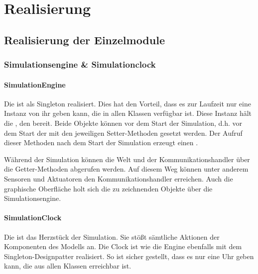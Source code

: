 \chapter{Realisierung}\label{chapter:realization}
%
\section{Realisierung der Einzelmodule}

\subsection{Simulationsengine \& Simulationclock}\label{subsec:real_engine}
\subsubsection{SimulationEngine}
Die  ist als Singleton realisiert. Dies hat den Vorteil, dass es zur Laufzeit nur eine Instanz von ihr geben kann, die in allen Klassen verfügbar ist. Diese Instanz hält die , den  bereit. Beide Objekte können vor dem Start der Simulation, d.h. vor dem Start der  mit den jeweiligen Setter-Methoden gesetzt werden. Der Aufruf dieser Methoden nach dem Start der Simulation erzeugt einen .

Während der Simulation können die Welt und der Kommunikationshandler über die Getter-Methoden abgerufen werden. Auf diesem Weg können unter anderem Sensoren und Aktuatoren den Kommunikationshandler erreichen. Auch die graphische Oberfläche holt sich die zu zeichnenden Objekte über die Simulationsengine.

\subsubsection{SimulationClock}
Die  ist das Herzstück der Simulation. Sie stößt sämtliche Aktionen der Komponenten des Modells an. Die Clock ist wie die Engine ebenfalls mit dem Singleton-Designpatter realisiert. So ist sicher gestellt, dass es nur eine Uhr geben kann, die aus allen Klassen erreichbar ist.

